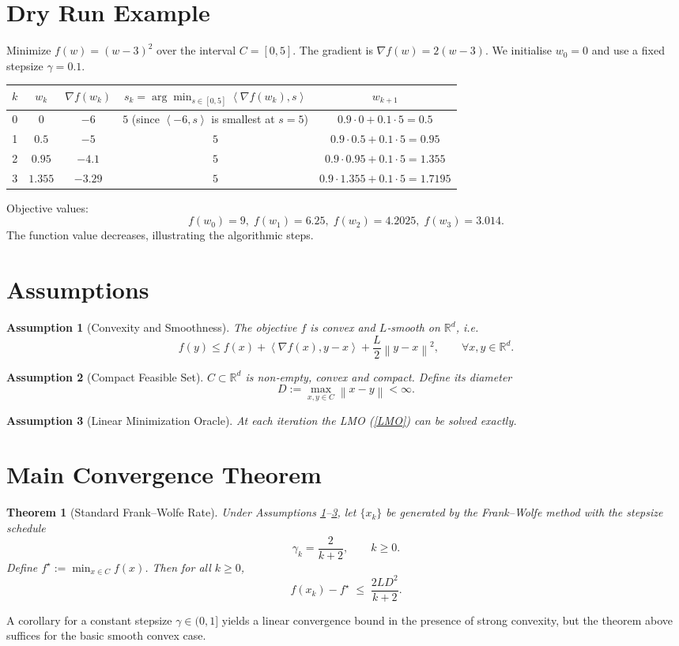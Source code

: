 \documentclass{article}
\newtheorem{theorem}{Theorem}
\newtheorem{assumption}{Assumption}
\newcommand{\norm}[1]{\left\lVert#1\right\rVert}
\newcommand{\ip}[2]{\left\langle #1,#2\right\rangle}
\begin{document}
\section*{Dry Run Example}
Minimize $f(w)=(w-3)^2$ over the interval $C=[0,5]$.
The gradient is $\nabla f(w)=2(w-3)$.  
We initialise $w_0=0$ and use a fixed stepsize $\gamma=0.1$.

\begin{center}
\begin{tabular}{c|c|c|c|c}
$k$ & $w_k$ & $\nabla f(w_k)$ & $s_k=\arg\min_{s\in[0,5]}\ip{\nabla f(w_k)}{s}$ & $w_{k+1}$ \\ \hline
0 & $0$ & $-6$ & $5$ (since $\ip{-6}{s}$ is smallest at $s=5$) & $0.9\cdot0+0.1\cdot5=0.5$ \\
1 & $0.5$ & $-5$ & $5$ & $0.9\cdot0.5+0.1\cdot5=0.95$ \\
2 & $0.95$ & $-4.1$ & $5$ & $0.9\cdot0.95+0.1\cdot5=1.355$ \\
3 & $1.355$ & $-3.29$ & $5$ & $0.9\cdot1.355+0.1\cdot5=1.7195$
\end{tabular}
\end{center}
Objective values:
\[
f(w_0)=9,\; f(w_1)=6.25,\; f(w_2)=4.2025,\; f(w_3)=3.014.
\]
The function value decreases, illustrating the algorithmic steps.

\newpage
\section*{Assumptions}
\begin{assumption}[Convexity and Smoothness]\label{ass:convexsmooth}
The objective $f$ is convex and $L$‑smooth on $\mathbb{R}^d$, i.e.
\[
f(y)\le f(x)+\ip{\nabla f(x)}{y-x}+\frac{L}{2}\norm{y-x}^2,\qquad\forall x,y\in\mathbb{R}^d.
\]
\end{assumption}
\begin{assumption}[Compact Feasible Set]\label{ass:compact}
$C\subset\mathbb{R}^d$ is non‑empty, convex and compact. Define its \emph{diameter}
\[
D:=\max_{x,y\in C}\norm{x-y}<\infty .
\]
\end{assumption}
\begin{assumption}[Linear Minimization Oracle]\label{ass:lmo}
At each iteration the LMO (\ref{LMO}) can be solved exactly.
\end{assumption}

\section*{Main Convergence Theorem}
\begin{theorem}[Standard Frank–Wolfe Rate]\label{thm:fw}
Under Assumptions \ref{ass:convexsmooth}–\ref{ass:lmo}, let $\{x_k\}$ be generated by the Frank–Wolfe method with the stepsize schedule
\[
\gamma_k=\frac{2}{k+2},\qquad k\ge0.
\]
Define $f^\star:=\min_{x\in C}f(x)$. Then for all $k\ge0$,
\[
f(x_k)-f^\star\;\le\; \frac{2LD^2}{k+2}.
\tag{FW‑Rate}
\]
\end{theorem}
A corollary for a constant stepsize $\gamma\in(0,1]$ yields a linear convergence bound in the presence of strong convexity, but the theorem above suffices for the basic smooth convex case.
\end{document}
